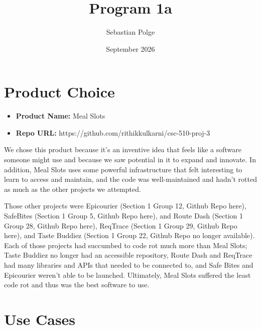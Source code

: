 \documentclass[sigconf]{acmart}
\title{Program 1a}
\author{Sebastian Polge}
\date{September 2026}
\begin{document}
\maketitle

\section{Product Choice}

\begin{itemize}
    \item \textbf{Product Name:} Meal Slots
    \item \textbf{Repo URL:} https://github.com/rithikkulkarni/csc-510-proj-3
\end{itemize}

We chose this product because it's an inventive idea that feels like a software someone might use and because we saw potential in it to expand and innovate. In addition, Meal Slots uses some powerful infrastructure that felt interesting to learn to access and maintain, and the code was well-maintained and hadn't rotted as much as the other projects we attempted.

Those other projects were Epicourier (Section 1 Group 12, Github Repo here), SafeBites (Section 1 Group 5, Github Repo here), and Route Dash (Section 1 Group 28, Github Repo here), ReqTrace (Section 1 Group 29, Github Repo here), and Taste Buddiez (Section 1 Group 22, Github Repo no longer available). Each of those projects had succumbed to code rot much more than Meal Slots; Taste Buddiez no longer had an accessible repository, Route Dash and ReqTrace had many libraries and APIs that needed to be connected to, and Safe Bites and Epicourier weren't able to be launched. Ultimately, Meal Slots suffered the least code rot and thus was the best software to use.

\section{Use Cases}
\end{document}
